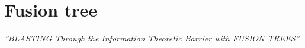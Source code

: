 \section{Fusion tree}

\emph{''BLASTING Through the Information Theoretic Barrier with FUSION TREES''} \cite{FredmanWillard1990}
